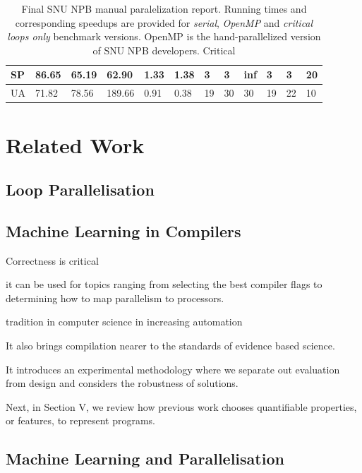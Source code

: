 \documentclass[sigconf,10pt,review,anonymous]{acmart}
\begin{document}
\begin{table}[h!]
\begin{tabular}[c]{|p{1cm}|p{1cm}|p{1cm}|p{1cm}|p{1cm}|p{1cm}|p{1cm}|p{1cm}|p{1cm}|p{1cm}|p{1cm}|p{1cm}|}
        \hline
        SP & 86.65 & 65.19 & 62.90 & 1.33 & 1.38 & 3 & \cellcolor[HTML]{91A1FA} 3 & \cellcolor[HTML]{FA8D8D} inf & \cellcolor[HTML]{91A1FA} 3 & \cellcolor[HTML]{91A1FA} 3 & \cellcolor[HTML]{FA8D8D} 20\\
        \hline
        UA & 71.82 & 78.56 & 189.66 & 0.91 & 0.38 & 19 & \cellcolor[HTML]{FA8D8D} 30 & \cellcolor[HTML]{FA8D8D} 30 & \cellcolor[HTML]{91A1FA} 19 & \cellcolor[HTML]{FA8D8D} 22 & \cellcolor[HTML]{7BB66B} 10\\
        \hline
    \end{tabular}
    \caption{Final SNU NPB manual paralelization report. Running times and corresponding speedups are provided for \textit{serial}, \textit{OpenMP} and \textit{critical loops only} benchmark versions. OpenMP is the hand-parallelized version of SNU NPB developers. Critical  }
    \label{tab:final_parallel_table}
\end{table}

\section{Related Work}
\label{related_work}

\subsection{Loop Parallelisation}

\subsection{Machine Learning in Compilers}
\quad Correctness is critical

it can be used for topics ranging from selecting the best compiler flags to determining how to map parallelism to processors.

tradition in computer science in increasing automation

It also brings compilation nearer to the standards of evidence based science.

It introduces an experimental methodology where we separate out evaluation from design and considers the robustness of solutions.

Next, in Section V, we review how previous work chooses quantifiable properties, or features, to represent programs.

\subsection{Machine Learning and Parallelisation}
\end{document}
